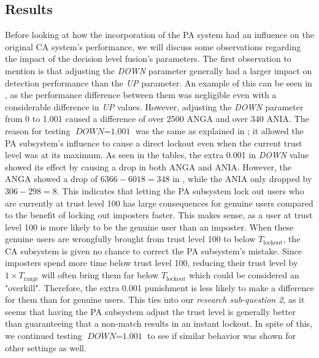 \subsection{Results}
\label{sec:analysis-decision-lvl-results}
Before looking at how the incorporation of the PA system had an influence on the original CA system's performance, we will discuss some observations regarding the impact of the decision level fusion's parameters.
The first observation to mention is that adjusting the \textit{DOWN} parameter generally had a larger impact on detection performance than the \textit{UP} parameter.
An example of this can be seen in , as the performance difference between them was negligible even with a considerable difference in \textit{UP} values.
However, adjusting the \textit{DOWN} parameter from 0 to 1.001 caused a difference of over 2500 ANGA and over 340 ANIA.
The reason for testing $\textit{DOWN}=\text{1.001}$ was the same as explained in ; it allowed the PA subsystem's influence to cause a direct lockout even when the current trust level was at its maximum.
As seen in the tables, the extra 0.001 in \textit{DOWN} value showed its effect by causing a drop in both ANGA and ANIA. 
However, the ANGA showed a drop of $6366-6018 = 348$ in , while the ANIA only dropped by $306-298 = 8$.
This indicates that letting the PA subsystem lock out users who are currently at trust level 100 has large consequences for genuine users compared to the benefit of locking out imposters faster.
This makes sense, as a user at trust level 100 is more likely to be the genuine user than an imposter.
When these genuine users are wrongfully brought from trust level 100 to below $T_{\text{lockout}}$, the CA subsystem is given no chance to correct the PA subsystem's mistake.
Since imposters spend more time below trust level 100, reducing their trust level by $1\times T_{\text{range}}$ will often bring them far below $T_{\text{lockout}}$ which could be considered an "overkill".
Therefore, the extra 0.001 punishment is less likely to make a difference for them than for genuine users.
This ties into our \textit{research sub-question 2}, as it seems that having the PA subsystem adjust the trust level is generally better than guaranteeing that a non-match results in an instant lockout.
In spite of this, we continued testing $\textit{DOWN} = \text{1.001}$ to see if similar behavior was shown for other settings as well.

